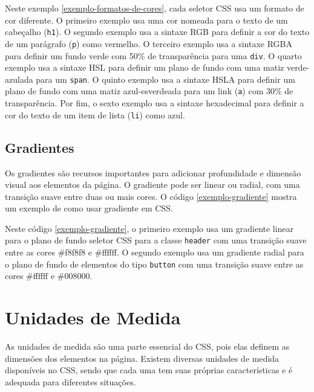 Neste exemplo \ref{exemplo-formatos-de-cores}, cada seletor CSS usa um formato de cor diferente. O primeiro exemplo usa uma cor nomeada  para o texto de um cabeçalho (\texttt{h1}). O segundo exemplo usa a sintaxe RGB para definir a cor do texto de um parágrafo (\texttt{p}) como vermelho. O terceiro exemplo usa a sintaxe RGBA para definir um fundo verde com 50\% de transparência para uma \texttt{div}. O quarto exemplo usa a sintaxe HSL para definir um plano de fundo com uma matiz verde-azulada para um \texttt{span}. O quinto exemplo usa a sintaxe HSLA para definir um plano de fundo com uma matiz azul-esverdeada para um link (\texttt{a}) com 30\% de transparência. Por fim, o sexto exemplo usa a sintaxe hexadecimal para definir a cor do texto de um item de lista (\texttt{li}) como azul.

\subsection{Gradientes}

Os gradientes são recursos importantes para adicionar profundidade e dimensão visual aos elementos da página. O gradiente pode ser linear ou radial, com uma transição suave entre duas ou mais cores. O código \ref{exemplo-gradiente} mostra um exemplo de como usar gradiente em CSS.


Neste código \ref{exemplo-gradiente}, o primeiro exemplo usa um gradiente linear para o plano de fundo seletor CSS para a classe \texttt{header} com uma transição suave entre as cores \#f8f8f8 e \#ffffff. O segundo exemplo usa um gradiente radial para o plano de fundo de elementos do tipo \texttt{button} com uma transição suave entre as cores \#ffffff e \#008000.

\section{Unidades de Medida}

As unidades de medida são uma parte essencial do CSS, pois elas definem as dimensões dos elementos na página. Existem diversas unidades de medida disponíveis no CSS, sendo que cada uma tem suas próprias características e é adequada para diferentes situações.

